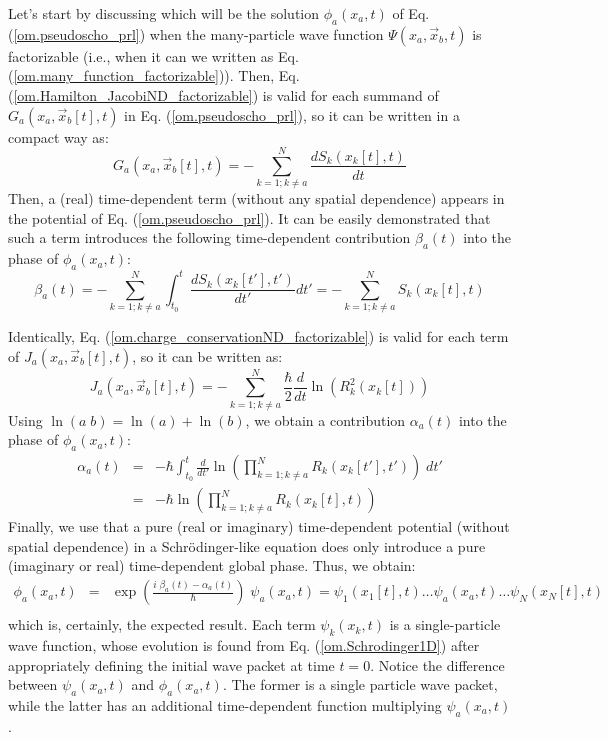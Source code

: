\documentclass[nofootinbib, secnumarabic, amsmath, nobibnotes,11pt,aps,pra, floatfix]{revtex4-1}
\newcommand{\eref}[1]{Eq. (\ref{#1})}
\begin{document}
Let's start by discussing which  will be the solution
$\phi_{a}(x_{a},t)$ of \eref{om.pseudoscho_prl} when the
many-particle wave function $\Psi(x_a,\vec x_b,t)$ is factorizable
(i.e., when it can we written as
\eref{om.many_function_factorizable}). Then,
\eref{om.Hamilton_JacobiND_factorizable} is valid for each summand
of $G_{a}(x_{a},\vec x_{b}[t],t)$ in
\eref{om.pseudoscho_prl}, so it can be written in a compact way as:
\begin{equation}
\label{om.prlpas_factorizable1}
G_{a}(x_{a},\vec x_{b}[t],t) = -\sum_{k = 1;k\neq a}^{N} \frac {d S_k(x_k[t],t)} {dt}
\end{equation}
Then, a (real) time-dependent term (without any spatial dependence)
appears in the potential of \eref{om.pseudoscho_prl}. It can be
easily demonstrated that such a term introduces the following
time-dependent contribution  \textit{$ \beta_a(t)$} into the phase of
$\phi_a(x_a,t)$:
\begin{equation}
\label{om.prlbeta}
\beta_a(t) = - \sum_{k = 1;k\neq a}^{N} \int_{t_0}^{t} \frac {d S_k(x_k[t'],t')} {dt'} dt' = -\sum_{k = 1;k\neq a}^{N} S_k(x_k[t],t)
\end{equation}

Identically, \eref{om.charge_conservationND_factorizable} is valid for each term of $J_{a}(x_{a},\vec x_{b}[t],t)$, so it can be written as:
\begin{equation}
\label{om.prlpas_factorizable2}
J_{a}(x_{a},\vec x_{b}[t],t) = -\sum_{k = 1;k\neq a}^{N} \frac {\hbar} {2} \frac {d} {dt} \ln \left( R_{k}^2(x_k[t]) \right)
\end{equation}
Using $\ln (a \; b) = \ln (a) + \ln (b)$, we obtain a contribution  $\alpha_a(t)$ into the phase of $\phi_a(x_a,t)$:
\begin{eqnarray}
\label{om.prlalpha} \alpha_a(t) &=& -\hbar \int_{t_0}^{t} \frac {d}
{dt'} \ln \left( \prod_{k = 1;k\neq a}^{N} R_k(x_k[t'],t') \right) \;
dt'\nonumber\\ &=& -\hbar \ln \left( \prod_{k = 1;k\neq a}^{N}
R_k(x_k[t],t) \right)
\end{eqnarray}
Finally, we use that a pure (real or imaginary) time-dependent
potential (without spatial dependence) in a Schr\"odinger-like
equation does only introduce a pure (imaginary or real)
time-dependent global phase. Thus, we obtain:
\begin{eqnarray}
\label{om.prlpas_factorizable3}
\phi_a(x_a,t) &=& \exp\left(\frac {i \; \beta_a(t)-\alpha_a(t)} {\hbar}\right) \;\psi_a(x_a,t)= \psi_1(x_1[t],t)\ldots\psi_a(x_a,t)\ldots\psi_N(x_N[t],t)\nonumber\\
\end{eqnarray}
which is, certainly, the expected result. Each term \textit{$\psi_k(x_k,t)$} is a single-particle wave function, whose evolution is found from \eref{om.Schrodinger1D} after appropriately defining the initial wave packet at time $t = 0$. Notice the difference between $\psi_a(x_a,t)$ and $\phi_a(x_a,t)$. The former is a single particle wave packet, while the latter has an additional time-dependent function multiplying $\psi_a(x_a,t)$.
\end{document}
